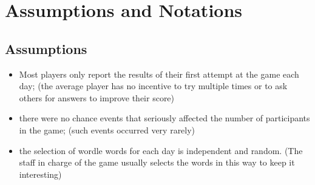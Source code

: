 \documentclass[12pt]{article}  %
\begin{document}




\section{Assumptions and Notations}
\subsection{Assumptions}
\begin{itemize}
	\setlength{\parsep}{0ex} %
	\setlength{\topsep}{2ex} %
	\setlength{\itemsep}{1ex} %
	\item Most players only report the results of their first attempt at the game each day; (the average player has no incentive to try multiple times or to ask others for answers to improve their score)
	\item there were no chance events that seriously affected the number of participants in the game; (such events occurred very rarely)
	\item the selection of wordle words for each day is independent and random. (The staff in charge of the game usually selects the words in this way to keep it interesting)
\end{itemize}
\end{document}
